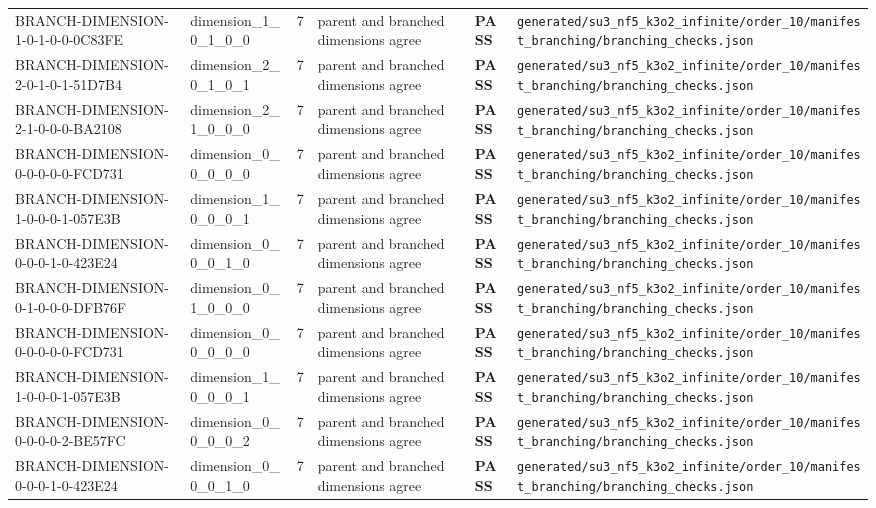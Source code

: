 \documentclass[11pt]{article}
\newcommand{\Pass}{\textcolor{green!50!black}{\textbf{PASS}}}
\newcommand{\RawPath}[1]{\texttt{#1}}
\begin{document}
\begin{longtable}{p{3cm}p{2.5cm}r p{3cm}l p{2cm}}
BRANCH-DIMENSION-1-0-1-0-0-0C83FE & dimension\_1\_0\_1\_0\_0 & 7 & parent and branched dimensions agree & \Pass & \RawPath{generated/su3\_nf5\_k3o2\_infinite/order\_10/manifest\_branching/branching\_checks.json}\\
BRANCH-DIMENSION-2-0-1-0-1-51D7B4 & dimension\_2\_0\_1\_0\_1 & 7 & parent and branched dimensions agree & \Pass & \RawPath{generated/su3\_nf5\_k3o2\_infinite/order\_10/manifest\_branching/branching\_checks.json}\\
BRANCH-DIMENSION-2-1-0-0-0-BA2108 & dimension\_2\_1\_0\_0\_0 & 7 & parent and branched dimensions agree & \Pass & \RawPath{generated/su3\_nf5\_k3o2\_infinite/order\_10/manifest\_branching/branching\_checks.json}\\
BRANCH-DIMENSION-0-0-0-0-0-FCD731 & dimension\_0\_0\_0\_0\_0 & 7 & parent and branched dimensions agree & \Pass & \RawPath{generated/su3\_nf5\_k3o2\_infinite/order\_10/manifest\_branching/branching\_checks.json}\\
BRANCH-DIMENSION-1-0-0-0-1-057E3B & dimension\_1\_0\_0\_0\_1 & 7 & parent and branched dimensions agree & \Pass & \RawPath{generated/su3\_nf5\_k3o2\_infinite/order\_10/manifest\_branching/branching\_checks.json}\\
BRANCH-DIMENSION-0-0-0-1-0-423E24 & dimension\_0\_0\_0\_1\_0 & 7 & parent and branched dimensions agree & \Pass & \RawPath{generated/su3\_nf5\_k3o2\_infinite/order\_10/manifest\_branching/branching\_checks.json}\\
BRANCH-DIMENSION-0-1-0-0-0-DFB76F & dimension\_0\_1\_0\_0\_0 & 7 & parent and branched dimensions agree & \Pass & \RawPath{generated/su3\_nf5\_k3o2\_infinite/order\_10/manifest\_branching/branching\_checks.json}\\
BRANCH-DIMENSION-0-0-0-0-0-FCD731 & dimension\_0\_0\_0\_0\_0 & 7 & parent and branched dimensions agree & \Pass & \RawPath{generated/su3\_nf5\_k3o2\_infinite/order\_10/manifest\_branching/branching\_checks.json}\\
BRANCH-DIMENSION-1-0-0-0-1-057E3B & dimension\_1\_0\_0\_0\_1 & 7 & parent and branched dimensions agree & \Pass & \RawPath{generated/su3\_nf5\_k3o2\_infinite/order\_10/manifest\_branching/branching\_checks.json}\\
BRANCH-DIMENSION-0-0-0-0-2-BE57FC & dimension\_0\_0\_0\_0\_2 & 7 & parent and branched dimensions agree & \Pass & \RawPath{generated/su3\_nf5\_k3o2\_infinite/order\_10/manifest\_branching/branching\_checks.json}\\
BRANCH-DIMENSION-0-0-0-1-0-423E24 & dimension\_0\_0\_0\_1\_0 & 7 & parent and branched dimensions agree & \Pass & \RawPath{generated/su3\_nf5\_k3o2\_infinite/order\_10/manifest\_branching/branching\_checks.json}\\

\end{longtable}
\end{document}
